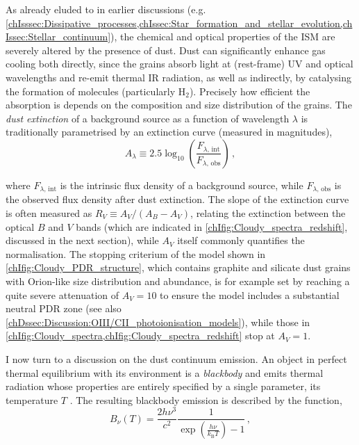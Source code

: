 As already eluded to in earlier discussions (e.g. \cref{chIsssec:Dissipative_processes,chIssec:Star_formation_and_stellar_evolution,chIssec:Stellar_continuum}), the chemical and optical properties of the ISM are severely altered by the presence of dust. Dust can significantly enhance gas cooling both directly, since the grains absorb light at (rest-frame) UV and optical wavelengths and re-emit thermal IR radiation, as well as indirectly, by catalysing the formation of molecules (particularly $\mathrm{H_2}$). Precisely how efficient the absorption is depends on the composition and size distribution of the grains. The \textit{dust extinction} of a background source as a function of wavelength $\lambda$ is traditionally parametrised by an extinction curve (measured in magnitudes),
\begin{equation}
    \label{chIeq:Dust_extinction}
    A_\lambda \equiv 2.5 \log_{10} \left( \frac{F_{\lambda, \, \text{int}}}{F_{\lambda, \, \text{obs}}} \right) \, ,
\end{equation}

\noindent where $F_{\lambda, \, \text{int}}$ is the intrinsic flux density of a background source, while $F_{\lambda, \, \text{obs}}$ is the observed flux density after dust extinction. The slope of the extinction curve is often measured as $R_V \equiv A_V/(A_B - A_V)$, relating the extinction between the optical $B$ and $V$ bands (which are indicated in \cref{chIfig:Cloudy_spectra_redshift}, discussed in the next section), while $A_V$ itself commonly quantifies the normalisation. The stopping criterium of the  model shown in \cref{chIfig:Cloudy_PDR_structure}, which contains graphite and silicate dust grains with Orion-like size distribution and abundance, is for example set by reaching a quite severe attenuation of $A_V = 10$ to ensure the model includes a substantial neutral PDR zone (see also \cref{chDssec:Discussion:OIII/CII_photoionisation_models}), while those in \cref{chIfig:Cloudy_spectra,chIfig:Cloudy_spectra_redshift} stop at $A_V = 1$.

I now turn to a discussion on the dust continuum emission. An object in perfect thermal equilibrium with its environment is a \textit{blackbody} and emits thermal radiation whose properties are entirely specified by a single parameter, its temperature $T$ \citep{1901AnP...309..553P}. The resulting blackbody emission is described by the \citeauthor{1901AnP...309..553P} function,
\begin{equation}
    \label{chIeq:Planck_function}
    B_\nu (T) = \frac{2 h \nu^3}{c^2} \frac{1}{\exp \left( \frac{h \nu}{k_\text{B} T} \right) - 1} \, ,
\end{equation}


